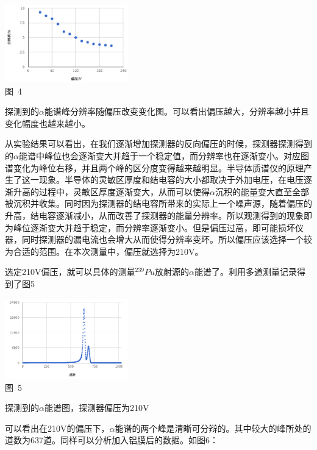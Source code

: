 \documentclass[a4paper,10.0pt,twoside]{npr}
\begin{document}
\begin{multicols}{2}
\begin{center}
   \includegraphics[width=0.4\textwidth]{fenbianlv.png}
\\
\xiaowu\song 图~4\begin{minipage}[t]{75mm} \quad 探测到的$\alpha$能谱峰分辨率随偏压改变变化图。可以看出偏压越大，分辨率越小并且变化幅度也越来越小。\\[-1mm]\wuhao
\end{minipage}
\end{center}

从实验结果可以看出，在我们逐渐增加探测器的反向偏压的时候，探测器探测得到的$\alpha$能谱中峰位也会逐渐变大并趋于一个稳定值，而分辨率也在逐渐变小。对应图谱变化为峰位右移，并且两个峰的区分度变得越来越明显。半导体质谱仪的原理产生了这一现象。半导体的灵敏区厚度和结电容的大小都取决于外加电压，在电压逐渐升高的过程中，灵敏区厚度逐渐变大，从而可以使得$\alpha$沉积的能量变大直至全部被沉积并收集。同时因为探测器的结电容所带来的实际上一个噪声源，随着偏压的升高，结电容逐渐减小，从而改善了探测器的能量分辨率。所以观测得到的现象即为峰位逐渐变大并趋于稳定，而分辨率逐渐变小。但是偏压过高，即可能损坏仪器，同时探测器的漏电流也会增大从而使得分辨率变坏。所以偏压应该选择一个较为合适的范围。在本次测量中，偏压就选择为210V。

选定210V偏压，就可以具体的测量$^{239}Pu$放射源的$\alpha$能谱了。利用多道测量记录得到了图5

\begin{center}
   \includegraphics[width=0.4\textwidth]{Pu.png}
\\
\xiaowu\song 图~5\begin{minipage}[t]{75mm} \quad 探测到的$\alpha$能谱图，探测器偏压为210V\\[-1mm]\wuhao
\end{minipage}
\end{center}
可以看出在210V的偏压下，$\alpha$能谱的两个峰是清晰可分辩的。其中较大的峰所处的道数为637道。同样可以分析加入铝膜后的数据。如图6：


\end{multicols}
\end{document}
